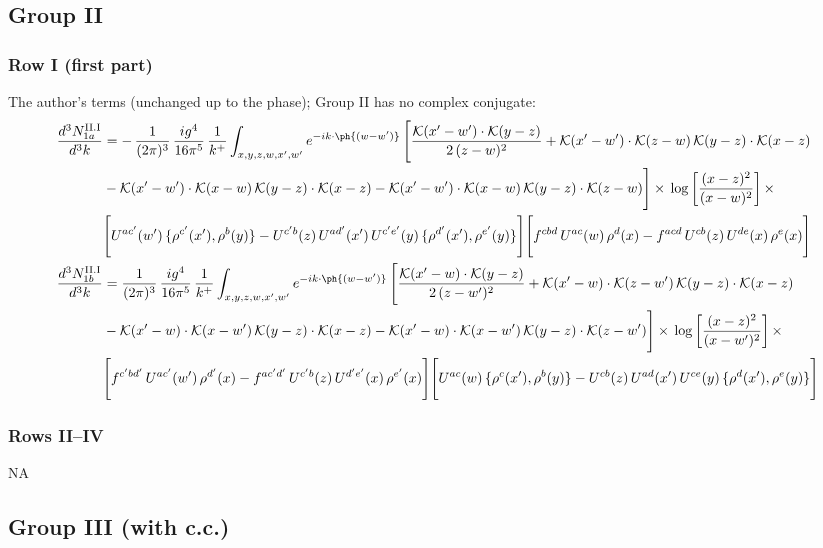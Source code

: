 \subsection{Group II}
\subsubsection*{Row I (first part)}
The author's terms (unchanged up to the phase); Group II has no complex conjugate:
\begin{align}
\frac{d^{3}N^{\rm II.I}_{1a}}{d^{3}k} & = -\,\frac{1}{(2\pi)^{3}}\,\frac{ig^{4}}{16\pi^{5}}\,\frac{1}{k^{+}}\int_{x,y,z,w,x',w'} e^{-ik\cdot\ph{(w-w')}}\,\Bigg[\frac{\mathcal{K}(x'-w')\cdot\mathcal{K}(y-z)}{2\,(z-w)^{2}}+\mathcal{K}(x'-w')\cdot\mathcal{K}(z-w)\,\mathcal{K}(y-z)\cdot\mathcal{K}(x-z)\notag \\ & -\mathcal{K}(x'-w')\cdot\mathcal{K}(x-w)\,\mathcal{K}(y-z)\cdot\mathcal{K}(x-z)-\mathcal{K}(x'-w')\cdot\mathcal{K}(x-w)\,\mathcal{K}(y-z)\cdot\mathcal{K}(z-w)\Bigg]\times\,\log\left[\frac{(x-z)^{2}}{(x-w)^{2}}\right]\times\,\notag \\
&\Bigg[U^{ac'}(w')\,\{\rho^{c'}(x'),\rho^{b}(y)\}-U^{c'b}(z)\,U^{ad'}(x')\,U^{c'e'}(y)\,\{\rho^{d'}(x'),\rho^{e'}(y)\}\Bigg]\Bigg[f^{cbd}\,U^{ac}(w)\,\rho^{d}(x)-f^{acd}\,U^{cb}(z)\,U^{de}(x)\,\rho^{e}(x)\Bigg]\label{eq:B-II1a}\\
\frac{d^{3}N^{\rm II.I}_{1b}}{d^{3}k} & = \frac{1}{(2\pi)^{3}}\,\frac{ig^{4}}{16\pi^{5}}\,\frac{1}{k^{+}}\int_{x,y,z,w,x',w'} e^{-ik\cdot\ph{(w-w')}}\,\Bigg[\frac{\mathcal{K}(x'-w)\cdot\mathcal{K}(y-z)}{2\,(z-w')^{2}}+\mathcal{K}(x'-w)\cdot\mathcal{K}(z-w')\,\mathcal{K}(y-z)\cdot\mathcal{K}(x-z)\notag \\ & -\mathcal{K}(x'-w)\cdot\mathcal{K}(x-w')\,\mathcal{K}(y-z)\cdot\mathcal{K}(x-z)-\mathcal{K}(x'-w)\cdot\mathcal{K}(x-w')\,\mathcal{K}(y-z)\cdot\mathcal{K}(z-w')\Bigg]\times\,\log\left[\frac{(x-z)^{2}}{(x-w')^{2}}\right]\times\,\notag \\
&\Bigg[f^{c'bd'}\,U^{ac'}(w')\,\rho^{d'}(x)-f^{ac'd'}\,U^{c'b}(z)\,U^{d'e'}(x)\,\rho^{e'}(x)\Bigg]\Bigg[U^{ac}(w)\,\{\rho^{c}(x'),\rho^{b}(y)\}-U^{cb}(z)\,U^{ad}(x')\,U^{ce}(y)\,\{\rho^{d}(x'),\rho^{e}(y)\}\Bigg]\label{eq:B-II1b}
\end{align}
\subsubsection*{Rows II--IV} \textsc{NA}
\subsection{Group III (with c.c.)}
